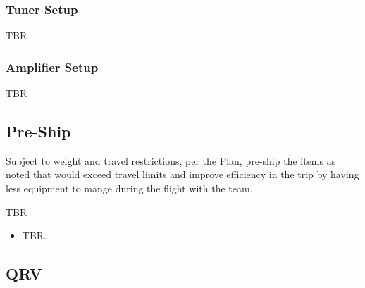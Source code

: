 \documentclass[11pt]{article}
\begin{document}
\subsubsection{Tuner Setup}
TBR

\subsubsection{Amplifier Setup}
TBR

\subsection{Pre-Ship}

Subject to weight and travel restrictions, per the Plan, pre-ship the items
as noted that would exceed travel limits and improve efficiency
in the trip by having less equipment to mange during the flight with the team.
\par
TBR
\begin{itemize}
\item TBR\ldots
\end{itemize}

\subsection{QRV}
\end{document}
